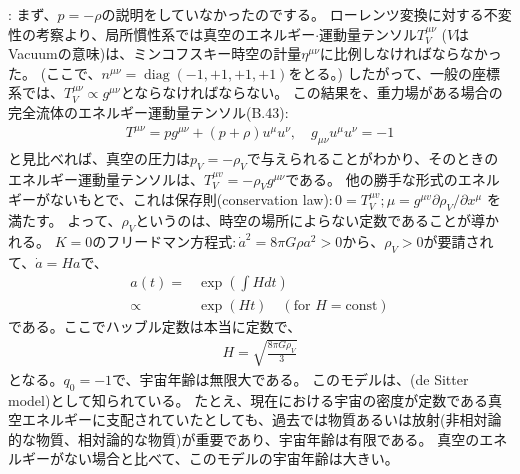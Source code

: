 \documentclass[11pt]{ltjsarticle}
\theoremstyle{plain}
\theoremstyle{break}
\def\diag{\mathop{\mathrm{diag}}\nolimits}%
\begin{document}
\noindent
{}:
まず、$p = - \rho$の説明をしていなかったのでする。
ローレンツ変換に対する不変性の考察より、局所慣性系では真空のエネルギー$\cdot$運動量テンソル$T_{V}^{\mu \nu}$ ($V$はVacuumの意味)は、ミンコフスキー時空の計量$\eta^{\mu \nu}$に比例しなければならなかった。
(ここで、$n^{\mu \nu} = \diag (-1,+1,+1,+1)$をとる。)
したがって、一般の座標系では、$T_{V}^{\mu \nu} \propto g^{\mu \nu}$とならなければならない。
この結果を、重力場がある場合の完全流体のエネルギー運動量テンソル(B.43):
\begin{align}
  T^{\mu \nu}=p g^{\mu \nu}+(p+\rho) u^{\mu} u^{\nu}, \quad g_{\mu \nu} u^{\mu} u^{\nu}=-1
\end{align}%
と見比べれば、真空の圧力は$p_{V} = - \rho_{V}$で与えられることがわかり、そのときのエネルギー運動量テンソルは、$T_{V}^{\mu v}=-\rho_{V} g^{\mu \nu}$である。
他の勝手な形式のエネルギーがないもとで、これは保存則(conservation law)$:0=T_{V}^{\mu v} ; \mu=g^{\mu v} \partial \rho_{V} / \partial x^{\mu}$ を満たす。
よって、$\rho_{V}$というのは、時空の場所によらない定数であることが導かれる。
$K=0$のフリードマン方程式$: \dot{a}^2 = 8\pi G \rho a^2 > 0$から、$\rho_V > 0$が要請されて、$\dot{a} = H a$で、
\begin{align}
  a(t) 
    =&  \exp( \int H dt) \\
    \propto & \exp( H t) \quad (\text{for $H=\mathrm{const}$})
\end{align}%
である。ここでハッブル定数は本当に定数で、
\begin{align}
  H=\sqrt{\frac{8 \pi G \rho_{V}}{3}}
\end{align}%
となる。$q_0 = -1$で、宇宙年齢は無限大である。
このモデルは、(de Sitter model)として知られている。
たとえ、現在における宇宙の密度が定数である真空エネルギーに支配されていたとしても、過去では物質あるいは放射(非相対論的な物質、相対論的な物質)が重要であり、宇宙年齢は有限である。
真空のエネルギーがない場合と比べて、このモデルの宇宙年齢は大きい。
\end{document}
